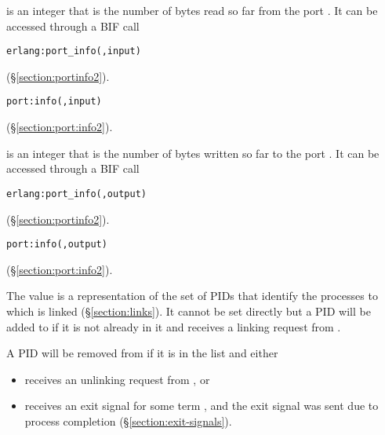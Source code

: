 \begin{Lentry}
\item[\T{count_in[\Z{R}]}]
 is an integer that is the number of bytes read so far from the
port .
It can be accessed through a BIF call
\ifOld\begin{alltt}
erlang:port_info(,input)
\end{alltt}
(\S\ref{section:portinfo2}).\fi
\ifStd\begin{alltt}
port:info(,input)
\end{alltt}
(\S\ref{section:port:info2}).\fi
{}

\item[\T{count_out[\Z{R}]}]
 is an integer that is the number of bytes written so far to the
port .
It can be accessed through a BIF call
\ifOld\begin{alltt}
erlang:port_info(,output)
\end{alltt}
(\S\ref{section:portinfo2}).\fi
\ifStd\begin{alltt}
port:info(,output)
\end{alltt}
(\S\ref{section:port:info2}).\fi
{}

\item[\T{linked[\Z{R}]}]
The value is a representation of the set of PIDs that identify
the processes to which  is linked (\S\ref{section:links}).
It cannot be set directly but a PID  will be added to 
if it is not already in it and  receives a linking request from .

A PID  will be removed from  if it is in the list and
either
\begin{itemize}
\item {} receives an unlinking request from , or
\item {} receives an exit signal  for some term
, and the exit signal was sent due to process completion
(\S\ref{section:exit-signals}).
\end{itemize}


\end{Lentry}
